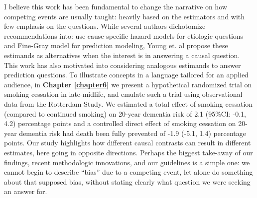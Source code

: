 \documentclass[
]{book}
\begin{document}
I believe this work has been fundamental to change the narrative on how competing events are usually taught: heavily based on the estimators and with few emphasis on the questions. While several authors dichotomize recommendations into: use cause-specific hazard models for etiologic questions and Fine-Gray model for prediction modeling\autocite{lau2009,austin2016}, Young et. al propose these estimands as alternatives when the interest is in answering a causal question\autocite{young2020}. This work has also motivated into considering analogous estimands to answer prediction questions\autocite{vangeloven2020}. To illustrate concepts in a language tailored for an applied audience, in \textbf{Chapter \ref{chapter6}} we present a hypothetical randomized trial on smoking cessation in late-midlife, and emulate such a trial using observational data from the Rotterdam Study. We estimated a total effect of smoking cessation (compared to continued smoking) on 20-year dementia risk of 2.1 (95\%CI: -0.1, 4.2) percentage points and a controlled direct effect of smoking cessation on 20-year dementia risk had death been fully prevented of -1.9 (-5.1, 1.4) percentage points. Our study highlights how different causal contrasts can result in different estimates, here going in opposite directions. Perhaps the biggest take-away of our findings, recent methodologic innovations, and our guidelines is a simple one: we cannot begin to describe ``bias'' due to a competing event, let alone do something about that supposed bias, without stating clearly what question we were seeking an answer for.
\end{document}
